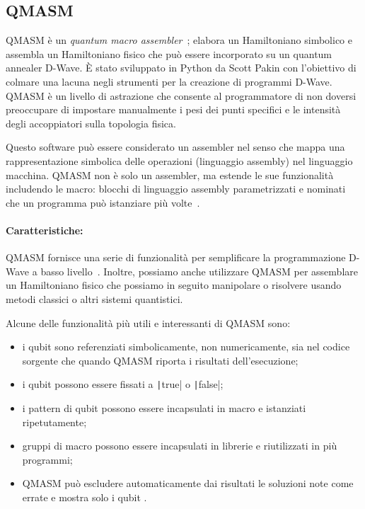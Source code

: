 \subsection{QMASM}
\label{sec:qmasm}
QMASM è un \emph{quantum macro assembler}~\cite{pakin2016quantum}; elabora un Hamiltoniano simbolico e assembla un Hamiltoniano fisico che può essere incorporato su un quantum annealer D-Wave. È stato sviluppato in Python da Scott Pakin con l'obiettivo di colmare una lacuna negli strumenti per la creazione di programmi D-Wave. QMASM è un livello di astrazione che consente al programmatore di non doversi preoccupare di impostare manualmente i pesi dei punti specifici e le intensità degli accoppiatori sulla topologia fisica. 

Questo software può essere considerato un assembler nel senso che mappa una rappresentazione simbolica delle operazioni (linguaggio assembly) nel linguaggio macchina. QMASM non è solo un assembler, ma estende le sue funzionalità includendo le macro: blocchi di linguaggio assembly parametrizzati e nominati che un programma può istanziare più volte~\cite{pakin2016quantum}.

\paragraph{Caratteristiche:} QMASM fornisce una serie di funzionalità per semplificare la programmazione D-Wave a basso livello~\cite{pakin2016quantum}. Inoltre, possiamo anche utilizzare QMASM per assemblare un Hamiltoniano fisico che possiamo in seguito manipolare o risolvere usando metodi classici o altri sistemi quantistici.

Alcune delle funzionalità più utili e interessanti di QMASM sono:
\begin{itemize}
	\item i qubit sono referenziati simbolicamente, non numericamente, sia nel codice sorgente che quando QMASM riporta i risultati dell'esecuzione;
	\item i qubit possono essere fissati a \texttt|true| o \texttt|false|;
	\item i pattern di qubit possono essere incapsulati in macro e istanziati ripetutamente;
	\item gruppi di macro possono essere incapsulati in librerie e riutilizzati in più programmi;
	\item QMASM può escludere automaticamente dai risultati le soluzioni note come errate e mostra solo i qubit .
\end{itemize}

